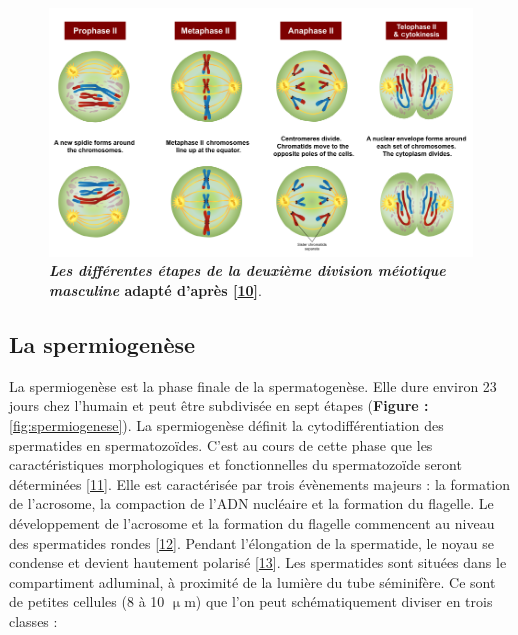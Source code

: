 \documentclass[12pt,a4paper,twoside]{ugathesis}
\theoremstyle{definition}
\theoremstyle{definition}
\theoremstyle{definition}
\theoremstyle{remark}
\begin{document}
\begin{figure}

{\centering \includegraphics[scale=0.43]{figure/MeiosisII} 

}

\caption[Les différentes étapes de la deuxième division méiotique masculine]{\textbf{\emph{Les différentes étapes de la deuxième
division méiotique masculine} adapté d'après
{[}\protect\hyperlink{ref-Reece2014}{10}{]}}.}\label{fig:meioseii}
\end{figure}





\newpage

\hypertarget{spermiogenese}{\subsection{La
spermiogenèse}\label{spermiogenese}}

La spermiogenèse est la phase finale de la spermatogenèse. Elle dure
environ 23 jours chez l'humain et peut être subdivisée en sept étapes
(\textbf{Figure : }\ref{fig:spermiogenese}). La spermiogenèse définit la
cytodifférentiation des spermatides en spermatozoïdes. C'est au cours de
cette phase que les caractéristiques morphologiques et fonctionnelles du
spermatozoïde seront déterminées
{[}\protect\hyperlink{ref-YvesClermontRichardOko1993}{11}{]}. Elle est
caractérisée par trois évènements majeurs : la formation de l'acrosome,
la compaction de l'ADN nucléaire et la formation du flagelle. Le
développement de l'acrosome et la formation du flagelle commencent au
niveau des spermatides rondes
{[}\protect\hyperlink{ref-Escalier1991}{12}{]}. Pendant l'élongation de
la spermatide, le noyau se condense et devient hautement polarisé
{[}\protect\hyperlink{ref-Hamilton1987}{13}{]}. Les spermatides sont
situées dans le compartiment adluminal, à proximité de la lumière du
tube séminifère. Ce sont de petites cellules (8 à 10 \(\upmu\)m) que
l'on peut schématiquement diviser en trois classes :
\end{document}
